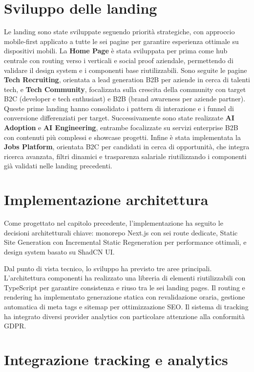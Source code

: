 \section{Sviluppo delle landing}
Le landing sono state sviluppate seguendo priorità strategiche, con approccio 
mobile-first applicato a tutte le sei pagine per garantire esperienza ottimale 
su dispositivi mobili. La \textbf{Home Page} è stata sviluppata per prima come 
hub centrale con routing verso i verticali e social proof aziendale, permettendo 
di validare il design system e i componenti base riutilizzabili. Sono seguite 
le pagine \textbf{Tech Recruiting}, orientata a lead generation B2B per aziende 
in cerca di talenti tech, e \textbf{Tech Community}, focalizzata sulla crescita 
della community con target B2C (developer e tech enthusiast) e B2B (brand 
awareness per aziende partner). Queste prime landing hanno consolidato i pattern 
di interazione e i funnel di conversione differenziati per target. Successivamente 
sono state realizzate \textbf{AI Adoption} e \textbf{AI Engineering}, entrambe 
focalizzate su servizi enterprise B2B con contenuti più complessi e showcase 
progetti. Infine è stata implementata la \textbf{Jobs Platform}, orientata B2C 
per candidati in cerca di opportunità, che integra ricerca avanzata, filtri 
dinamici e trasparenza salariale riutilizzando i componenti già validati nelle 
landing precedenti.

\section{Implementazione architettura}
Come progettato nel capitolo precedente, l'implementazione ha seguito le decisioni 
architetturali chiave: monorepo Next.js con sei route dedicate, Static Site 
Generation con Incremental Static Regeneration per performance ottimali, e 
design system basato su ShadCN UI.

Dal punto di vista tecnico, lo sviluppo ha previsto tre aree principali. 
L'architettura componenti ha realizzato una libreria di elementi riutilizzabili 
con TypeScript per garantire consistenza e riuso tra le sei landing pages. 
Il routing e rendering ha implementato generazione statica con revalidazione 
oraria, gestione automatica di meta tags e sitemap per ottimizzazione SEO. 
Il sistema di tracking ha integrato diversi provider analytics con particolare 
attenzione alla conformità GDPR.

\section{Integrazione tracking e analytics}

